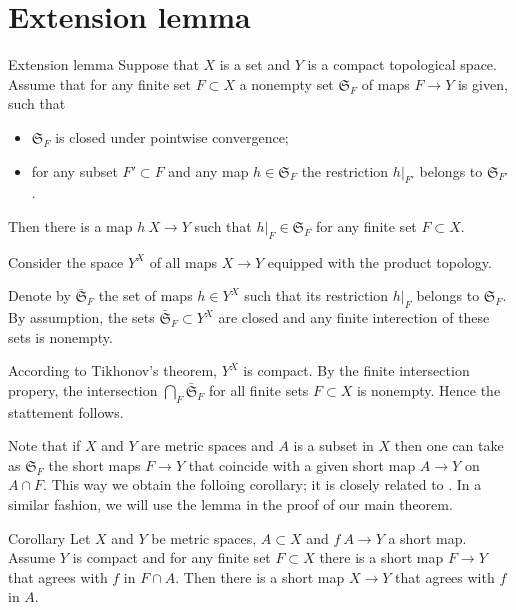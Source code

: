 \section{Extension lemma}\label{Finite-whole extension lemma}

\begin{thm}{Extension lemma}\label{lem:finite-whole}
Suppose that $X$ is a set 
and $Y$ is a compact topological space.
Assume that for any finite set $F\subset X$ 
a nonempty set $\mathfrak{S}_F$ of maps  $F\to Y$ is given, such that
\begin{itemize}
\item $\mathfrak{S}_F$ is closed under pointwise convergence;
\item for any subset $F'\subset F$ and any map $h\in \mathfrak{S}_F$
the restriction $h|_{F'}$ belongs to $\mathfrak{S}_{F'}$. 
\end{itemize}

Then there is a map $h\: X\to Y$ such that $h|_F\in \mathfrak{S}_F$ for any finite set $F\subset X$.
\end{thm}

Consider the space $Y^X$ of all maps $X\to Y$ equipped with the product topology.

Denote by $\bar{\mathfrak{S}}_F$ the set of maps $h\in Y^X$ such that its restriction $h|_F$ belongs to $\mathfrak{S}_F$.
By assumption, the sets $\bar{\mathfrak{S}}_F\subset Y^X$ are closed and any finite interection of these sets is nonempty.

According to Tikhonov's theorem, $Y^X$ is compact.
By the finite intersection propery, the intersection $\bigcap_F\bar{\mathfrak{S}}_F$ for all finite sets $F\subset X$ is nonempty.
Hence the stattement follows.
\qeds

Note that if $X$ and $Y$ are metric spaces and $A$ is a subset in $X$
then one can take as $\mathfrak{S}_F$ the short maps $F\to Y$ that coincide with a given short map $A\to Y$ on $A\cap F$.
This way we obtain the folloing corollary; it is closely related to \cite[Proposition 5.2]{lang-shroeder}.
In a similar fashion, we will use the lemma in the proof of our main theorem.

\begin{thm}{Corollary}
Let $X$ and $Y$ be metric spaces, $A\subset X$ and $f\:A\to Y$ a short map.
Assume $Y$ is compact and for any finite set $F\subset X$ there is a short map $F\to Y$ that agrees with $f$ in $F\cap A$.
Then there is a short map $X\to Y$ that agrees with $f$ in $A$.
\end{thm}